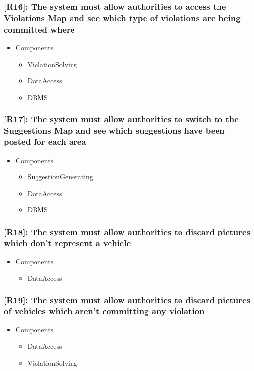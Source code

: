 \documentclass[12pt,a4paper]{article}
\begin{document}
\subsubsection*{[R16]: The system must allow authorities to access the Violations Map and see which type of violations are being committed where}
\begin{itemize}
\item Components
\begin{itemize}
\item ViolationSolving
\item DataAccess
\item DBMS
\end{itemize}
\end{itemize}
\subsubsection*{[R17]: The system must allow authorities to switch to the Suggestions Map and see which suggestions have been posted for each area}
\begin{itemize}
\item Components
\begin{itemize}
\item SuggestionGenerating
\item DataAccess
\item DBMS
\end{itemize}
\end{itemize}
\subsubsection*{[R18]: The system must allow authorities to discard pictures which don't represent a vehicle}
\begin{itemize}
\item Components
\begin{itemize}
\item DataAccess
\end{itemize}
\end{itemize}
\subsubsection*{[R19]: The system must allow authorities to discard pictures of vehicles which aren't committing any violation}
\begin{itemize}
\item Components
\begin{itemize}
\item DataAccess
\item ViolationSolving
\end{itemize}
\end{itemize}
\end{document}
